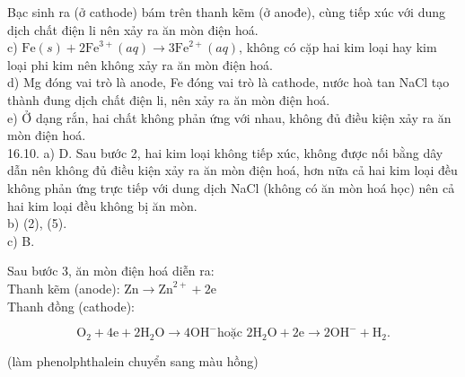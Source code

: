 \documentclass[10pt]{article}
\begin{document}
Bạc sinh ra (ở cathode) bám trên thanh kẽm (ở anođe), cùng tiếp xúc với dung dịch chất điện li nên xảy ra ăn mòn điện hoá.\\
c) $\mathrm{Fe}(s)+2 \mathrm{Fe}^{3+}(a q) \rightarrow 3 \mathrm{Fe}^{2+}(a q)$, không có cặp hai kim loại hay kim loại phi kim nên không xảy ra ăn mòn điện hoá.\\
d) Mg đóng vai trò là anode, Fe đóng vai trò là cathode, nước hoà tan NaCl tạo thành đung dịch chất điện li, nên xảy ra ăn mòn điện hoá.\\
e) Ở dạng rắn, hai chất không phản ứng với nhau, không đủ điều kiện xảy ra ăn mòn điện hoá.\\
16.10. a) D. Sau bước 2, hai kim loại không tiếp xúc, không được nối bằng dây dẫn nên không đủ điều kiện xảy ra ăn mòn điện hoá, hơn nữa cả hai kim loại đều không phản ứng trực tiếp với dung dịch NaCl (không có ăn mòn hoá học) nên cả hai kim loại đều không bị ăn mòn.\\
b) (2), (5).\\
c) B.

Sau bước 3, ăn mòn điện hoá diễn ra:\\
Thanh kẽm (anode): $\mathrm{Zn} \rightarrow \mathrm{Zn}^{2+}+2 \mathrm{e}$\\
Thanh đồng (cathode):

$$
\mathrm{O}_{2}+4 \mathrm{e}+2 \mathrm{H}_{2} \mathrm{O} \rightarrow 4 \mathrm{OH}^{-} \text {hoặc } 2 \mathrm{H}_{2} \mathrm{O}+2 \mathrm{e} \rightarrow 2 \mathrm{OH}^{-}+\mathrm{H}_{2} .
$$

(làm phenolphthalein chuyển sang màu hồng)
\end{document}
